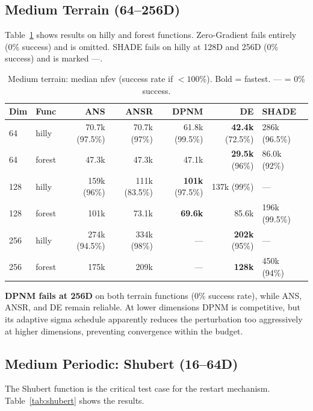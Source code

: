 \documentclass[11pt,a4paper]{article}
\begin{document}
\subsection{Medium Terrain (64--256D)}

Table~\ref{tab:terrain} shows results on hilly and forest functions. Zero-Gradient fails entirely (0\% success) and is omitted. SHADE fails on hilly at 128D and 256D (0\% success) and is marked ---.

\begin{table}[h]
\centering
\caption{Medium terrain: median nfev (success rate if $< 100\%$). Bold = fastest. --- = 0\% success.}
\label{tab:terrain}
\begin{tabular}{@{}llrrrrl@{}}
\toprule
Dim & Func & ANS & ANSR & DPNM & DE & SHADE \\
\midrule
64 & hilly  & 70.7k (97.5\%) & 70.7k (97\%) & 61.8k (99.5\%) & \textbf{42.4k} (72.5\%) & 286k (96.5\%) \\
64 & forest & 47.3k & 47.3k & 47.1k & \textbf{29.5k} (96\%) & 86.0k (92\%) \\
\midrule
128 & hilly  & 159k (96\%) & 111k (83.5\%) & \textbf{101k} (97.5\%) & 137k (99\%) & --- \\
128 & forest & 101k & 73.1k & \textbf{69.6k} & 85.6k & 196k (99.5\%) \\
\midrule
256 & hilly  & 274k (94.5\%) & 334k (98\%) & --- & \textbf{202k} (95\%) & --- \\
256 & forest & 175k & 209k & --- & \textbf{128k} & 450k (94\%) \\
\bottomrule
\end{tabular}
\end{table}

\textbf{DPNM fails at 256D} on both terrain functions (0\% success rate), while ANS, ANSR, and DE remain reliable. At lower dimensions DPNM is competitive, but its adaptive sigma schedule apparently reduces the perturbation too aggressively at higher dimensions, preventing convergence within the budget.

\subsection{Medium Periodic: Shubert (16--64D)}
\label{sec:shubert}

The Shubert function is the critical test case for the restart mechanism. Table~\ref{tab:shubert} shows the results.
\end{document}

